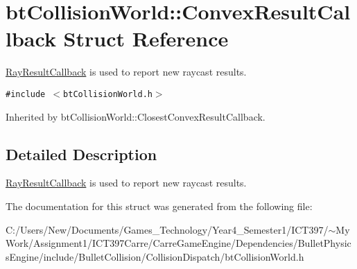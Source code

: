 \hypertarget{structbt_collision_world_1_1_convex_result_callback}{
\section{btCollisionWorld::ConvexResultCallback Struct Reference}
\label{structbt_collision_world_1_1_convex_result_callback}
}
\hyperlink{structbt_collision_world_1_1_ray_result_callback}{RayResultCallback} is used to report new raycast results.  


{\tt \#include $<$btCollisionWorld.h$>$}

Inherited by btCollisionWorld::ClosestConvexResultCallback.



\subsection{Detailed Description}
\hyperlink{structbt_collision_world_1_1_ray_result_callback}{RayResultCallback} is used to report new raycast results. 

The documentation for this struct was generated from the following file:\begin{CompactItemize}
\item 
C:/Users/New/Documents/Games\_\-Technology/Year4\_\-Semester1/ICT397/$\sim$My Work/Assignment1/ICT397Carre/CarreGameEngine/Dependencies/BulletPhysicsEngine/include/BulletCollision/CollisionDispatch/btCollisionWorld.h\end{CompactItemize}
